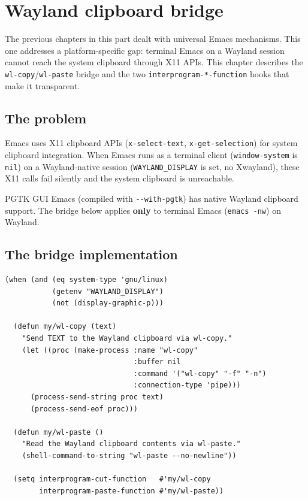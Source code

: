 \chapter{Wayland clipboard bridge}
\label{ch:wayland-clipboard}
\minitoc\label{wayland-clipboard-bridge}

The previous chapters in this part dealt with universal Emacs
mechanisms.  This one addresses a platform-specific gap: terminal
Emacs on a Wayland session cannot reach the system clipboard through
X11 APIs.  This chapter describes the
\texttt{wl-copy}/\texttt{wl-paste} bridge and the two
\texttt{interprogram-*-function} hooks that make it transparent.

\section{The problem}\label{the-problem-2}

Emacs uses X11 clipboard APIs (\texttt{x-select-text}, \texttt{x-get-selection}) for system clipboard integration. When Emacs runs as a terminal client (\texttt{window-system} is \texttt{nil}) on a Wayland-native session (\texttt{WAYLAND\_DISPLAY} is set, no Xwayland), these X11 calls fail silently and the system clipboard is unreachable.

PGTK GUI Emacs (compiled with \texttt{-\/-with-pgtk}) has native Wayland clipboard support. The bridge below applies \textbf{only} to terminal Emacs (\texttt{emacs -nw}) on Wayland.

\section{The bridge implementation}\label{the-bridge-implementation}

\begin{verbatim}
(when (and (eq system-type 'gnu/linux)
           (getenv "WAYLAND_DISPLAY")
           (not (display-graphic-p)))

  (defun my/wl-copy (text)
    "Send TEXT to the Wayland clipboard via wl-copy."
    (let ((proc (make-process :name "wl-copy"
                              :buffer nil
                              :command '("wl-copy" "-f" "-n")
                              :connection-type 'pipe)))
      (process-send-string proc text)
      (process-send-eof proc)))

  (defun my/wl-paste ()
    "Read the Wayland clipboard contents via wl-paste."
    (shell-command-to-string "wl-paste --no-newline"))

  (setq interprogram-cut-function   #'my/wl-copy
        interprogram-paste-function #'my/wl-paste))
\end{verbatim}

